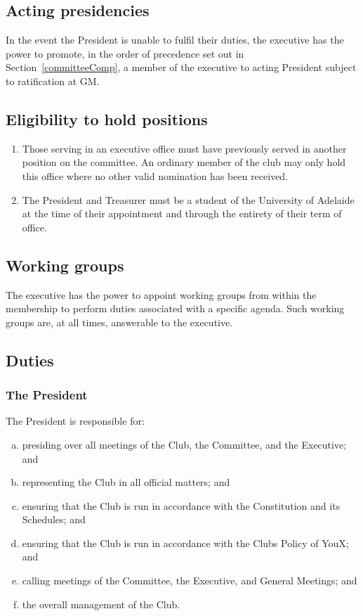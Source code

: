 \documentclass{constitution}
\begin{document}
\subsection{Acting presidencies}
In the event the President is unable to fulfil their duties, the executive has the power to promote, in the order of precedence set out in Section~\ref{committeeComp}, a member of the executive to acting President subject to ratification at GM.

\subsection{Eligibility to hold positions}
\begin{enumerate}[(1)]
    \item Those serving in an executive office must have previously served in another position on the committee. An ordinary member of the club may only hold this office where no other valid nomination has been received.
    \item The President and Treasurer must be a student of the University of Adelaide at the time of their appointment and through the entirety of their term of office.
\end{enumerate}

\subsection{Working groups}
The executive has the power to appoint working groups from within the membership to perform duties associated with a specific agenda. Such working groups are, at all times, answerable to the executive.

\subsection{Duties}

\subsubsection{The President}
The President is responsible for:
\begin{enumerate}[(a)]
    \item presiding over all meetings of the Club, the Committee, and the Executive; and
    \item representing the Club in all official matters; and
    \item ensuring that the Club is run in accordance with the Constitution and its Schedules; and
    \item ensuring that the Club is run in accordance with the Clubs Policy of YouX;
          and
    \item calling meetings of the Committee, the Executive, and General Meetings;
          and
    \item the overall management of the Club.
\end{enumerate}
\end{document}
